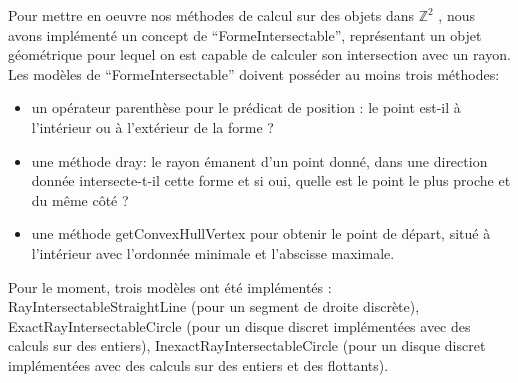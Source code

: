 
Pour mettre en oeuvre nos méthodes de calcul sur des objets dans $\mathbb{Z}^{2}$ , nous avons implémenté un concept de ``FormeIntersectable'', 
représentant un objet géométrique pour lequel on est capable de calculer son intersection avec un rayon. Les modèles de ``FormeIntersectable''
doivent posséder au moins trois méthodes: 

\begin{itemize}
  \item un opérateur parenthèse pour le prédicat de position : le point est-il à l'intérieur ou à l'extérieur de la forme ?
  \item une méthode dray: le rayon émanent d'un point donné, dans une direction donnée intersecte-t-il cette forme et si oui, quelle est le point le plus proche et du même côté ?
  \item une méthode getConvexHullVertex pour obtenir le point de départ, situé à l'intérieur avec l'ordonnée minimale et l'abscisse maximale. 
\end{itemize}

Pour le moment, trois modèles ont été implémentés : RayIntersectableStraightLine (pour un segment de droite discrète), ExactRayIntersectableCircle (pour un disque discret implémentées avec des calculs sur des entiers), InexactRayIntersectableCircle (pour un disque discret implémentées avec des calculs sur des entiers et des flottants).

